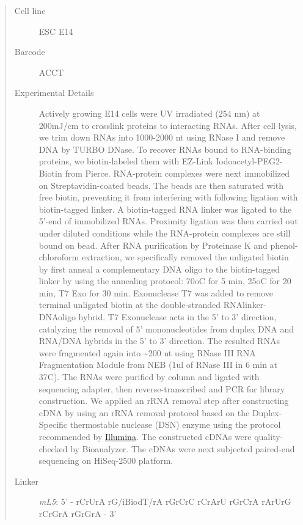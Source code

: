 \documentclass[letterpaper,10pt,english]{sphinxmanual}
\begin{document}
\label{Data_Resources:e14-1}\begin{quote}\begin{description}
\item[{Cell line}] \leavevmode
ESC E14

\item[{Barcode}] \leavevmode
ACCT

\item[{Experimental Details}] \leavevmode
Actively growing E14 cells were UV irradiated (254 nm) at 200mJ/cm
to crosslink proteins to interacting RNAs. After cell lysis, we trim down RNAs into
1000-2000 nt using RNase I and remove DNA by TURBO DNase. To recover RNAs bound to
RNA-binding proteins, we biotin-labeled them with EZ-Link Iodoacetyl-PEG2-Biotin from
Pierce. RNA-protein complexes were next immobilized on Streptavidin-coated beads. The
beads are then saturated with free biotin, preventing it from interfering with following
ligation with biotin-tagged linker. A biotin-tagged RNA linker was ligated to the 5’-end
of immobilized RNAs. Proximity ligation was then carried out under diluted conditions
while the RNA-protein complexes are still bound on bead. After RNA purification by
Proteinase K and phenol-chloroform extraction, we specifically removed the unligated
biotin by first anneal a complementary DNA oligo to the biotin-tagged linker by using
the annealing protocol: 70oC for 5 min, 25oC for 20 min, T7 Exo for 30 min. Exonuclease
T7 was added to remove terminal unligated biotin at the double-stranded RNAlinker-DNAoligo
hybrid. T7 Exonuclease acts in the 5' to 3' direction, catalyzing the removal of 5'
mononucleotides from duplex DNA and RNA/DNA hybrids in the 5’ to 3’ direction. The resulted
RNAs were fragmented again into \textasciitilde{}200 nt using RNase III RNA Fragmentation Module from NEB
(1ul of RNase III in 6 min at 37C). The RNAs were purified by column and ligated with
sequencing adapter, then reverse-transcribed and PCR for library construction. We applied
an rRNA removal step after constructing cDNA by using an rRNA removal protocol based on
the Duplex-Specific thermostable nuclease (DSN) enzyme using the protocol recommended by
\href{http://supportres.illumina.com/documents/myillumina/7836bd3e-3358-4834-b2f7-80f80acb4e3f/dsn\_normalization\_sampleprep\_application\_note\_15014673\_c.pdf}{Illumina}.
The constructed cDNAs were quality-checked by Bioanalyzer. The cDNAs were next
subjected paired-end sequencing on HiSeq-2500 platform.

\item[{Linker}] \leavevmode
\emph{mL5}: 5' - rCrUrA rG/iBiodT/rA rGrCrC rCrArU rGrCrA rArUrG rCrGrA rGrGrA - 3'

\end{description}\end{quote}
\end{document}
